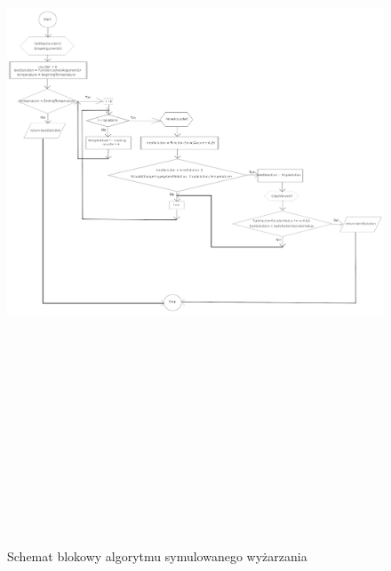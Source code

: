 \documentclass[twoside]{projektInzynierskiMS1}
\begin{document}
\begin{figure}[H]
		\includegraphics[height=22cm, width=16cm]{pics/schematBlokowy.png}\\
	\caption{Schemat blokowy algorytmu symulowanego wyżarzania}
\end{figure}
	
\end{document}

